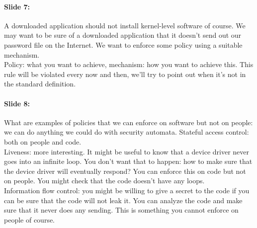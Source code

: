 \documentclass[10pt,a4paper]{report}
\begin{document}
\paragraph{Slide 7:} A downloaded application should not install kernel-level software of course. We may want to be sure of a downloaded application that it doesn't send out our password file on the Internet. We want to enforce some policy using a suitable mechanism.\\
Policy: what you want to achieve, mechanism: how you want to achieve this. This rule will be violated every now and then, we'll try to point out when it's not in the standard definition.

\paragraph{Slide 8:} What are examples of policies that we can enforce on software but not on people: we can do anything we could do with security automata. Stateful access control: both on people and code.\\
Liveness: more interesting. It might be useful to know that a device driver never goes into an infinite loop. You don't want that to happen: how to make sure that the device driver will eventually respond? You can enforce this on code but not on people. You might check that the code doesn't have any loops. \\
Information flow control: you might be willing to give a secret to the code if you can be sure that the code will not leak it. You can analyze the code and make sure that it never does any sending. This is something you cannot enforce on people of course. 
\end{document}

